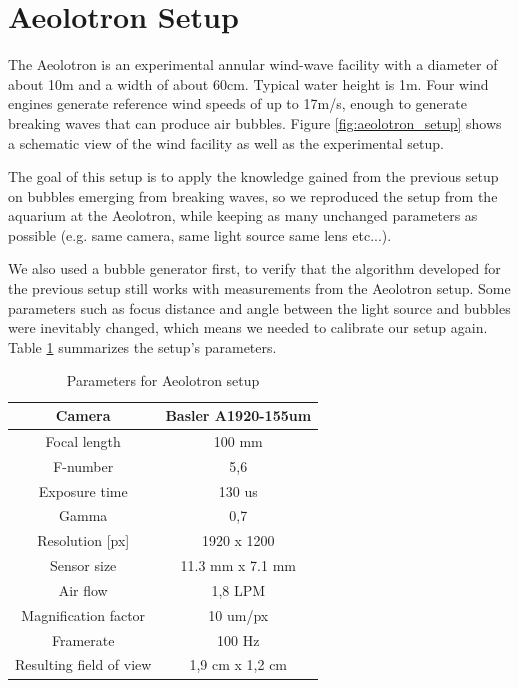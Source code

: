 	\section{Aeolotron Setup}
		The Aeolotron is an experimental annular wind-wave facility with a diameter of about 10m and a width of about 60cm. Typical water height is 1m. Four wind engines generate reference wind speeds of up to 17m/s, enough to generate breaking waves that can produce air bubbles. Figure \ref{fig:aeolotron_setup} shows a schematic view of the wind facility as well as the experimental setup.
		
		The goal of this setup is to apply the knowledge gained from the previous setup on bubbles emerging from breaking waves, so we reproduced the setup from the aquarium at the Aeolotron, while keeping as many unchanged parameters as possible (e.g. same camera, same light source same lens etc...).
		
	We also used a bubble generator first, to verify that the algorithm developed for the previous setup still works with measurements from the Aeolotron setup. Some parameters such as focus distance and angle between the light source and bubbles were inevitably changed, which means we needed to calibrate our setup again. Table \ref{tab:aeolotron_setup} summarizes the setup's parameters.
	
		\begin{table}
			\centering
		
			\begin{tabular}{|c|c|}
			\hline 
			Camera & Basler A1920-155um \\ 
			\hline 
			Focal length & 100 mm \\ 
			\hline 
			F-number & 5,6 \\ 
			\hline 
			Exposure time & 130 us \\ 
			\hline 
			Gamma & 0,7 \\
			\hline
			Resolution [px] &1920 x 1200 \\
			\hline 
			Sensor size & 11.3 mm x 7.1 mm \\
			\hline
			Air flow & 1,8 LPM  \\ 
			\hline 
			Magnification factor & 10 um/px \\ 
			\hline 
			Framerate & 100 Hz \\ 
			\hline 
			Resulting field of view & 1,9 cm x 1,2 cm \\
			\hline
			\end{tabular} 
			
			\caption{Parameters for Aeolotron setup}
			\label{tab:aeolotron_setup}

		\end{table}
		
